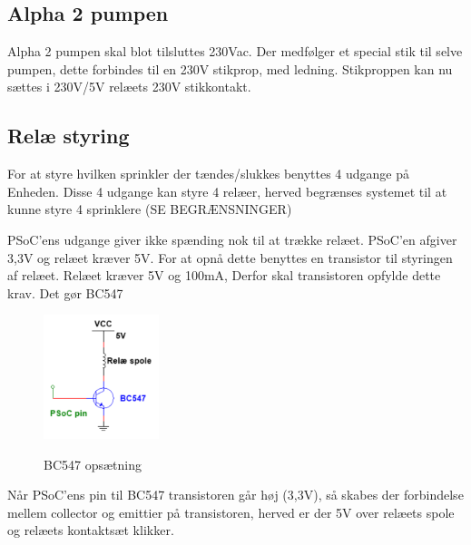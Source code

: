 \subsection{Alpha 2 pumpen}

Alpha 2 pumpen skal blot tilsluttes 230Vac. Der medfølger et special stik til selve pumpen, dette forbindes til en 230V stikprop, med ledning. Stikproppen kan nu sættes i 230V/5V relæets 230V stikkontakt.

\subsection{Relæ styring}
For at styre hvilken sprinkler der tændes/slukkes benyttes 4 udgange på Enheden. Disse 4 udgange kan styre 4 relæer, herved begrænses systemet til at kunne styre 4 sprinklere (SE BEGRÆNSNINGER)

PSoC'ens udgange giver ikke spænding nok til at trække relæet. PSoC'en afgiver 3,3V og relæet kræver 5V. For at opnå dette benyttes en transistor til styringen af relæet. Relæet kræver 5V og 100mA, Derfor skal transistoren opfylde dette krav. Det gør BC547 

\begin{figure}[H] \centering
{\includegraphics[width=0.3\textwidth]{filer/design/Billeder/BC547}}
\caption{BC547 opsætning}
\label{lab:BC547}
\raggedright
\end{figure} 

Når PSoC'ens pin til BC547 transistoren går høj (3,3V), så skabes der forbindelse mellem collector og emittier på transistoren, herved er der 5V over relæets spole og relæets kontaktsæt klikker. 


